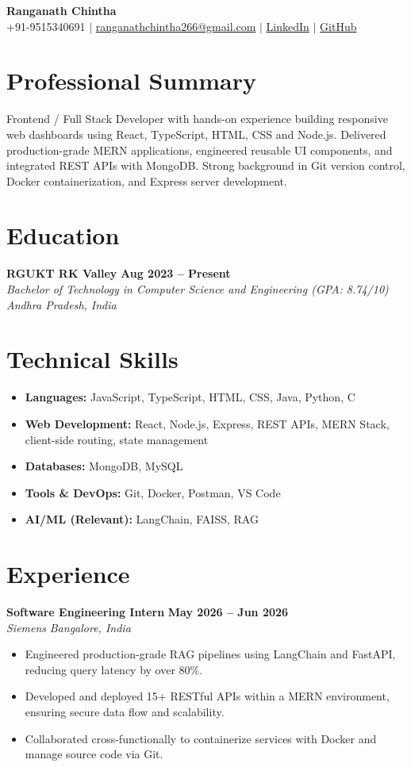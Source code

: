 \documentclass[letterpaper,11pt]{article}
\newcommand{\resumeItem}[1]{\item\small{#1}}
\newcommand{\resumeSubheading}[4]{%
  \vspace{2pt}\textbf{#1} \hfill \textbf{\small #2} \\
  \textit{\small #3} \hfill \textit{\small #4}\vspace{-1pt}}
\begin{document}
\begin{center}
{\Huge \textbf{Ranganath Chintha}} \\
\small
+91-9515340691 $\mid$ \href{mailto:ranganathchintha266@gmail.com}{ranganathchintha266@gmail.com} $\mid$ \href{https://linkedin.com/in/ranganathchintha}{LinkedIn} $\mid$ \href{https://github.com/RanganathChintha}{GitHub}
\end{center}
\vspace{-2pt}
\section*{Professional Summary}
Frontend / Full Stack Developer with hands-on experience building responsive web dashboards using React, TypeScript, HTML, CSS and Node.js. Delivered production-grade MERN applications, engineered reusable UI components, and integrated REST APIs with MongoDB. Strong background in Git version control, Docker containerization, and Express server development.
\section*{Education}
\resumeSubheading{RGUKT RK Valley}{Aug 2023 -- Present}{Bachelor of Technology in Computer Science and Engineering (GPA: 8.74/10)}{Andhra Pradesh, India}
\section*{Technical Skills}
\begin{itemize}[leftmargin=1.4em,label={}]
  \item \small{\textbf{Languages:} JavaScript, TypeScript, HTML, CSS, Java, Python, C}
  \item \small{\textbf{Web Development:} React, Node.js, Express, REST APIs, MERN Stack, client-side routing, state management}
  \item \small{\textbf{Databases:} MongoDB, MySQL}
  \item \small{\textbf{Tools \& DevOps:} Git, Docker, Postman, VS Code}
  \item \small{\textbf{AI/ML (Relevant):} LangChain, FAISS, RAG}
\end{itemize}
\section*{Experience}
\resumeSubheading{Software Engineering Intern}{May 2026 -- Jun 2026}{Siemens}{Bangalore, India}
\begin{itemize}
  \resumeItem{Engineered production-grade RAG pipelines using LangChain and FastAPI, reducing query latency by over 80\%.}
  \resumeItem{Developed and deployed 15+ RESTful APIs within a MERN environment, ensuring secure data flow and scalability.}
  \resumeItem{Collaborated cross-functionally to containerize services with Docker and manage source code via Git.}
\end{itemize}
\end{document}
